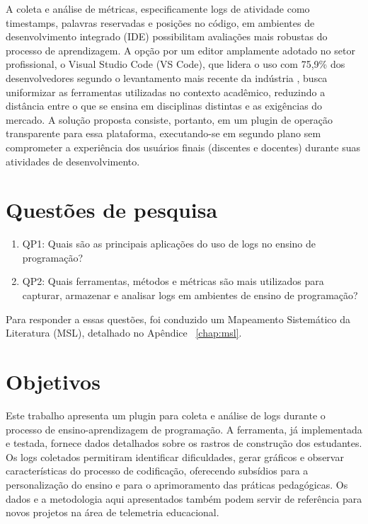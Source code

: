 A coleta e análise de métricas, especificamente logs de atividade como timestamps, palavras reservadas e posições no código, em ambientes de desenvolvimento integrado (IDE) possibilitam avaliações mais robustas do processo de aprendizagem. A opção por um editor amplamente adotado no setor profissional, o Visual Studio Code (VS Code), que lidera o uso com 75,9\% dos desenvolvedores segundo o levantamento mais recente da indústria \cite{StackOverflowSurvey2025}, busca uniformizar as ferramentas utilizadas no contexto acadêmico, reduzindo a distância entre o que se ensina em disciplinas distintas e as exigências do mercado. A solução proposta consiste, portanto, em um plugin de operação transparente para essa plataforma, executando-se em segundo plano sem comprometer a experiência dos usuários finais (discentes e docentes) durante suas atividades de desenvolvimento.

\section{Questões de pesquisa}\label{sec:questoes-de-pesquisas}
\begin{enumerate}
    \item QP1: Quais são as principais aplicações do uso de logs no ensino de programação?
    \item QP2: Quais ferramentas, métodos e métricas são mais utilizados para capturar, armazenar e analisar logs em ambientes de ensino de programação?
\end{enumerate}

Para responder a essas questões, foi conduzido um Mapeamento Sistemático da 
Literatura (MSL), detalhado no Apêndice ~\ref{chap:msl}.
\section{Objetivos}
\label{sec:objetivos}

Este trabalho apresenta um plugin para coleta e análise de logs durante o processo de ensino-aprendizagem de programação. A ferramenta, já implementada e testada, fornece dados detalhados sobre os rastros de construção dos estudantes. Os logs coletados permitiram identificar dificuldades, gerar gráficos e observar características do processo de codificação, oferecendo subsídios para a personalização do ensino e para o aprimoramento das práticas pedagógicas. Os dados e a metodologia aqui apresentados também podem servir de referência para novos projetos na área de telemetria educacional.

